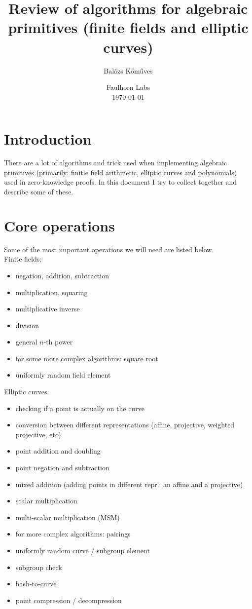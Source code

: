\documentclass[12pt,draft,a4paper,openany,oneside]{amsbook}
\title{Review of algorithms for algebraic primitives (finite fields and elliptic curves)}
\author{Bal\'azs K\H{o}m\H{u}ves}
\date{%
Faulhorn Labs\\%
\today}
\theoremstyle{plain}
\theoremstyle{definition}
\begin{document}
\maketitle

\setcounter{tocdepth}{2}
\tableofcontents


\section{Introduction}

There are a lot of algorithms and trick used when implementing algebraic primitives
(primarily: finitie field arithmetic, elliptic curves and polynomials) used in
zero-knowledge proofs. In this document I try to collect together and describe
some of these.

\section{Core operations}

Some of the most important operations we will need are listed below.\\

Finite fields:
\begin{itemize}
\item negation, addition, subtraction
\item multiplication, squaring
\item multiplicative inverse
\item division
\item general $n$-th power
\item for some more complex algorithms: square root
\item uniformly random field element \\
\end{itemize}

Elliptic curves:
\begin{itemize}
\item checking if a point is actually on the curve
\item conversion between different representations (affine, projective, weighted projective, etc)
\item point addition and doubling
\item point negation and subtraction
\item mixed addition (adding points in different repr.: an affine and a projective)
\item scalar multiplication
\item multi-scalar multiplication (MSM)
\item for more complex algorithms: pairings
\item uniformly random curve / subgroup element
\item subgroup check
\item hash-to-curve
\item point compression / decompression \\
\end{itemize}
\end{document}
